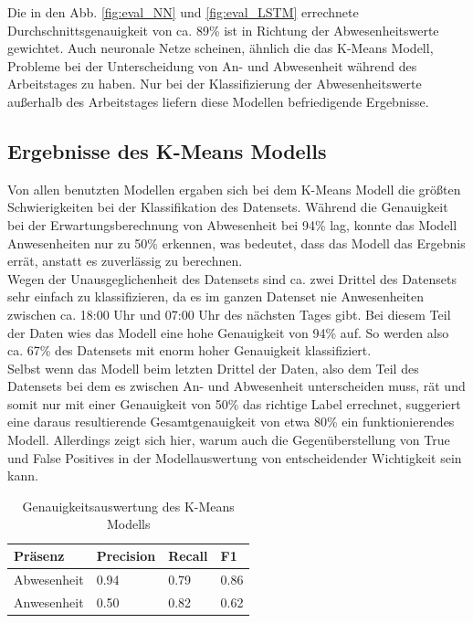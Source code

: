 Die in den Abb. \ref{fig:eval_NN} und \ref{fig:eval_LSTM} errechnete Durchschnittsgenauigkeit von ca. 89\%
ist in Richtung der Abwesenheitswerte gewichtet. Auch neuronale Netze scheinen, ähnlich die das K-Means Modell,
Probleme bei der Unterscheidung von An- und Abwesenheit während des Arbeitstages zu haben. Nur bei der 
Klassifizierung der Abwesenheitswerte außerhalb des Arbeitstages liefern diese Modellen befriedigende 
Ergebnisse.
\newpage

\subsection{Ergebnisse des K-Means Modells}\label{KMeans}
Von allen benutzten Modellen ergaben sich bei dem K-Means Modell die größten Schwierigkeiten bei der 
Klassifikation des Datensets. 
Während die Genauigkeit bei der Erwartungsberechnung von Abwesenheit bei 94\% lag, konnte das
Modell Anwesenheiten nur zu 50\% erkennen, was bedeutet, dass das Modell das Ergebnis errät, anstatt
es zuverlässig zu berechnen. \\
Wegen der Unausgeglichenheit des Datensets sind ca. zwei Drittel des Datensets sehr einfach zu 
klassifizieren, da es im ganzen Datenset nie Anwesenheiten zwischen ca. 18:00 Uhr und 07:00 Uhr des nächsten 
Tages gibt. Bei diesem Teil der Daten wies das Modell eine hohe Genauigkeit von 94\% auf. So werden also 
ca. 67\% des Datensets mit enorm hoher Genauigkeit klassifiziert.\\
Selbst wenn das Modell beim letzten Drittel der Daten, also dem Teil des Datensets bei dem es zwischen
An- und Abwesenheit unterscheiden muss, rät und somit nur mit einer Genauigkeit von 50\% das richtige Label 
errechnet, suggeriert eine daraus resultierende Gesamtgenauigkeit von etwa 80\% ein funktionierendes Modell.
Allerdings zeigt sich hier, warum auch die Gegenüberstellung von True und False Positives in der 
Modellauswertung von entscheidender Wichtigkeit sein kann.\\

\begin{center}
    \begin{table}[h]
        \centering
        \caption{Genauigkeitsauswertung des K-Means Modells}
        \begin{tabular}{|p{2.5cm}||p{1.8cm}|p{1.5cm}|p{1.5cm}|}
            \hline
            \hfill Präsenz&\hfill Precision &\hfill Recall &\hfill F1\\
            \hline
            \hline
            \hfill Abwesenheit&\hfill 0.94&\hfill 0.79&\hfill 0.86\\
            \hfill Anwesenheit&\hfill 0.50&\hfill 0.82&\hfill 0.62\\
            \hline
        \end{tabular}          
        \label{tab:clus}
    \end{table}
\end{center}

